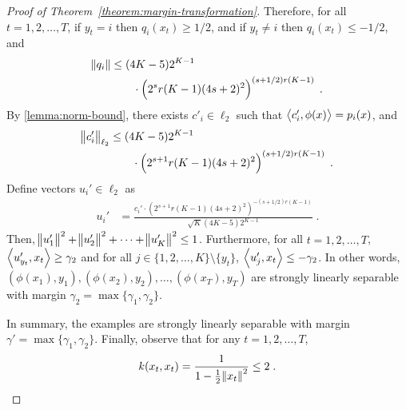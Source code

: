 \begin{proof}[Proof of Theorem~\ref{theorem:margin-transformation}]
Therefore, for all $t=1,2,\dots,T$, if $y_t = i$ then $q_i(x_t) \ge 1/2$,
 and if $y_t \neq i$ then $q_i(x_t) \le -1/2$, and
\begin{align*}
  \norm{q_i} & \le (4K-5) 2^{K-1} \\
  & \qquad \cdot \left(2^{s} r(K-1) (4s+2)^2 \right)^{(s+1/2)r(K-1)} \; .
\end{align*}
By \autoref{lemma:norm-bound}, there exists $c'_i \in \ell_2$ such that
$\left\langle c'_i, \phi(x) \right\rangle = p_i(x)$, and
\begin{align*}
  \norm{c'_i}_{\ell_2} & \le (4K-5) 2^{K-1} \\
  & \qquad \cdot \left(2^{s+1} r(K-1) (4s+2)^2 \right)^{(s+1/2)r(K-1)} \; .
\end{align*}
Define vectors $u_i' \in \ell_2$ as
\begin{align*}
u_i' & = \frac{c_i'  \cdot \left(2^{s+1} r(K-1) (4s+2)^2 \right)^{-(s+1/2)r(K-1)}}{\sqrt{K} (4K-5) 2^{K-1}} \; .
\end{align*}
Then,
$\norm{u_1'}^2 + \norm{u_2'}^2 + \dots + \norm{u_K'}^2 \le 1$.
Furthermore, for all $t=1,2,\dots,T$,
$\left\langle u'_{y_t}, x_t \right\rangle \ge \gamma_2$
and for all $j \in \{1,2,\dots,K\} \setminus \{y_t\}$,
$\left\langle u'_j, x_t \right\rangle \le - \gamma_2$. In other words,
$(\phi(x_1), y_1), (\phi(x_2), y_2), \dots, (\phi(x_T), y_T)$ are
strongly linearly separable with margin $\gamma_2 = \max\{\gamma_1, \gamma_2\}$.

In summary, the examples are strongly
linearly separable with margin $\gamma' = \max\{\gamma_1, \gamma_2\}$.
Finally, observe that for any $t=1,2,\dots,T$,
\[
k(x_t,x_t) = \frac{1}{1 - \frac{1}{2} \norm{x_t}^2} \le 2 \; .
\qedhere
\]
\end{proof}
